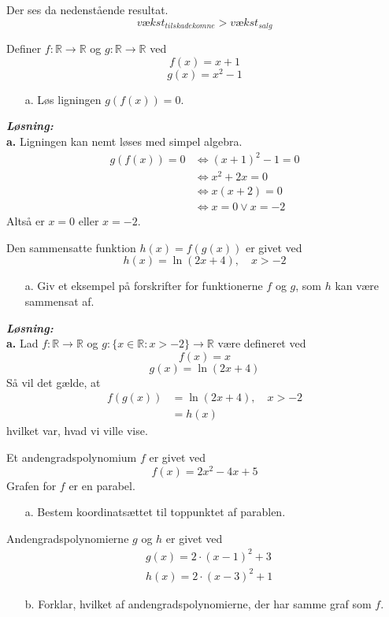 \documentclass{article}
\newcommand{\sol}{\setlength{\parindent}{0cm}\textbf{\textit{Løsning:}}\setlength{\parindent}{1cm}}
\begin{document}
Der ses da nedenstående resultat.
\[
vækst_{tilskadekomne}>vækst_{salg}
\] 
\begin{question}{}{}
 Definer $f: \mathbb{R} \to \mathbb{R}$ og $g: \mathbb{R} \to \mathbb{R}$ ved
  \[
  f(x)=x+1
  \]
  \[
  g(x)=x^2-1
  \] 
\begin{itemize}
  \item[a.] Løs ligningen $g(f(x))=0$.
\end{itemize}
\end{question}
\sol \\ 
\textbf{a.} Ligningen kan nemt løses med simpel algebra.
\begin{equation*}
\begin{split}
  g(f(x))=0 &\iff (x+1)^2-1=0 \\ &\iff x^2+2x=0 \\ &\iff x(x+2)=0 \\ &\iff x=0 \lor x=-2  
\end{split}  
\end{equation*}
Altså er $x=0$ eller $x=-2$. 
\pagebreak
\begin{question}{}{}
  Den sammensatte funktion $h(x)=f(g(x))$ er givet ved
  \[
  h(x)=\ln (2 x+4), \quad x>-2
  \] 
\begin{itemize}
  \item[a.] Giv et eksempel på forskrifter for funktionerne $f$ og $g$, som $h$ kan være sammensat af. 
\end{itemize}
\end{question}
\sol \\ 
\textbf{a.} Lad $f:\mathbb{R} \to \mathbb{R}$ og $g:\{ x \in \mathbb{R}:x>-2\} \to \mathbb{R}$ være defineret ved
\[
f(x)=x
\] 
\[
g(x)= \ln (2 x+4)
\]
Så vil det gælde, at
\begin{equation*}
\begin{split}
  f(g(x))&=\ln (2 x+4), \quad x>-2 \\ &= h(x)   
\end{split}
\end{equation*}
hvilket var, hvad vi ville vise.
\begin{question}{}{}
 Et andengradspolynomium $f$ er givet ved
  \[
  f(x)=2x^2-4x+5
  \] 
Grafen for $f$ er en parabel.
\begin{itemize}
  \item[a.] Bestem koordinatsættet til toppunktet af parablen.
\end{itemize}
Andengradspolynomierne $g$ og $h$ er givet ved
\[
\begin{aligned}
& g(x)=2 \cdot(x-1)^2+3 \\
& h(x)=2 \cdot(x-3)^2+1
\end{aligned}
\] 
\begin{itemize}
  \item[b.] Forklar, hvilket af andengradspolynomierne, der har samme graf som $f$.
\end{itemize}
\end{question}
\end{document}

